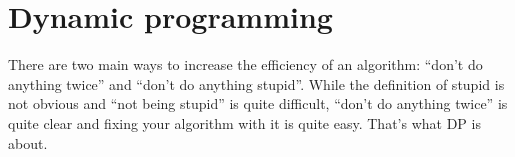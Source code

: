 \section{Dynamic programming}

There are two main ways to increase the efficiency of an algorithm:
``don't do anything twice'' and ``don't do anything stupid''.
While the definition of stupid is not obvious and
``not being stupid'' is quite difficult,
``don't do anything twice'' is quite clear and fixing your algorithm
with it is quite easy. That's what DP is about.




